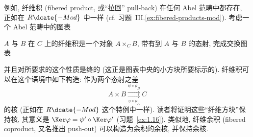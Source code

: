 \begin{example}\label{ex:fibered-products-abelian}
例如, 纤维积 (fibered product, 或``拉回'' pull-back) 在任何 Abel 范畴中都存在, 正如在 $R\dcate{-Mod}$ 中一样 (cf. 习题~III.\ref{ex:fibered-products-mod}). 考虑一个 Abel 范畴中的图表
\begin{center}
\end{center}
$A$ 与 $B$ 在 $C$ 上的纤维积是一个对象 $A\times_C B$, 带有到 $A$ 与 $B$ 的态射, 完成交换图表
\begin{center}
\end{center}
并且对所要求的这个性质是终的 (这正是图表中央的小方块所要标示的). 纤维积可以在这个语境中如下构造: 作为两个态射之差
\[
A\times B \underset{\varphi\circ\rho_A}{\overset{\psi\circ\rho_B}{\rightrightarrows}} C
\]
的核
(正如在 $R\dcate{-Mod}$ 这个特例中一样). 读者将证明这些``纤维方块''保持核, 其意义是 $\Ker\varphi=\psi'\circ\Ker\varphi'$ (习题~\ref{ex:1.16}).
类似地, 纤维余积 (fibered coproduct, 又名推出 push-out) 可以构造为余积的余核, 并保持余核.
\end{example}

